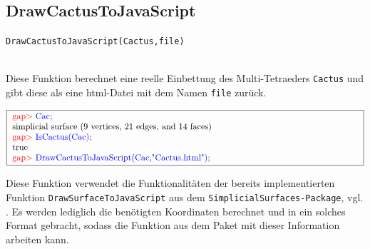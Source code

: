 \documentclass[12pt,titlepage,twoside,cleardoublepage]{article}
\theoremstyle{nummermitklammern}
\numberwithin{equation}{section}
\begin{document}
\subsection{DrawCactusToJavaScript}
\begin{large}
\texttt{DrawCactusToJavaScript(Cactus,file)}
\end{large}\\
Diese Funktion berechnet eine reelle Einbettung des Multi-Tetraeders \texttt{Cactus} und gibt diese als eine html-Datei mit dem Namen \texttt{file} zurück.
\begin{center}
$\fbox{
\parbox{14cm}{
\textcolor{red}{gap$>$} \textcolor{blue}{Cac;}\newline
simplicial surface (9 vertices, 21 edges, and 14 faces)\newline
\textcolor{red}{gap$>$} \textcolor{blue}{IsCactus(Cac);}\newline
true\newline 
\textcolor{red}{gap$>$} \textcolor{blue}{DrawCactusToJavaScript(Cac,"Cactus.html");}
}
}$
\end{center}
Diese Funktion verwendet die Funktionalitäten der bereits implementierten Funktion \texttt{DrawSurfaceToJavaScript} aus dem \texttt{SimplicialSurfaces-Package}, vgl. \cite{gapsimp}. Es werden lediglich die benötigten Koordinaten berechnet und in ein solches Format gebracht, sodass die Funktion aus dem Paket mit dieser Information arbeiten kann. 
\end{document}
